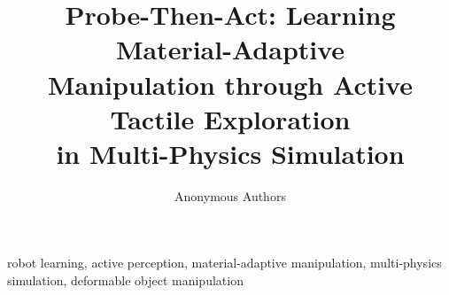 \documentclass[journal]{IEEEtran}
\title{Probe-Then-Act: Learning Material-Adaptive\\Manipulation through Active Tactile Exploration\\in Multi-Physics Simulation}
\author{Anonymous Authors}
\begin{document}
\maketitle

\begin{abstract}

\end{abstract}

\begin{IEEEkeywords}
robot learning, active perception, material-adaptive manipulation, multi-physics simulation, deformable object manipulation
\end{IEEEkeywords}











\end{document}
